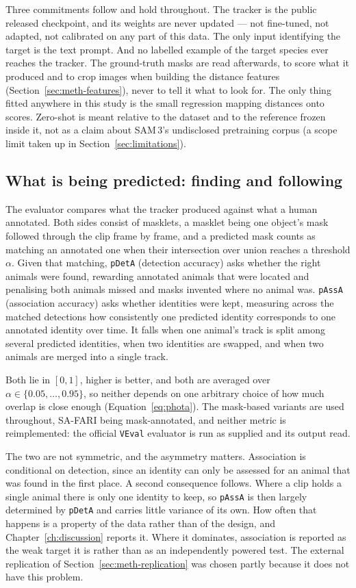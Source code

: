 Three commitments follow and hold throughout. The tracker is the public released checkpoint, and its weights
are never updated --- not fine-tuned, not adapted, not calibrated on any part of this data. The only input
identifying the target is the text prompt. And no labelled example of the target species ever reaches the
tracker. The ground-truth masks are read afterwards, to score what it produced and to crop images when building
the distance features (Section~\ref{sec:meth-features}), never to tell it what to look for. The only thing
fitted anywhere in this study is the small regression mapping distances onto scores. Zero-shot is meant
relative to the dataset and to the reference frozen inside it, not as a claim about SAM\,3's undisclosed
pretraining corpus (a scope limit taken up in Section~\ref{sec:limitations}).

\subsection{What is being predicted: finding and following}
\label{sec:meth-targets}
The evaluator compares what the tracker produced against what a human annotated. Both sides consist of
masklets, a masklet being one object's mask followed through the clip frame by frame, and a predicted mask
counts as matching an annotated one when their intersection over union reaches a threshold $\alpha$. Given that
matching, \texttt{pDetA} (detection accuracy) asks whether the right animals were found, rewarding annotated
animals that were located and penalising both animals missed and masks invented where no animal was.
\texttt{pAssA} (association accuracy) asks whether identities were kept, measuring across the matched
detections how consistently one predicted identity corresponds to one annotated identity over time. It falls
when one animal's track is split among several predicted identities, when two identities are swapped, and when
two animals are merged into a single track.

Both lie in $[0,1]$, higher is better, and both are averaged over $\alpha\in\{0.05,\dots,0.95\}$, so neither
depends on one arbitrary choice of how much overlap is close enough (Equation~\ref{eq:phota}). The mask-based
variants are used throughout, SA-FARI being mask-annotated, and neither metric is reimplemented: the official
\texttt{VEval} evaluator is run as supplied and its output read.

The two are not symmetric, and the asymmetry matters. Association is conditional on detection, since an
identity can only be assessed for an animal that was found in the first place. A second consequence follows.
Where a clip holds a single animal there is only one identity to keep, so
\texttt{pAssA} is then largely determined by \texttt{pDetA} and carries little variance of its own. How often
that happens is a property of the data rather than of the design, and Chapter~\ref{ch:discussion} reports it.
Where it dominates, association is reported as the weak target it is rather than as an independently powered
test. The external replication of Section~\ref{sec:meth-replication} was chosen partly because it does not have
this problem.

